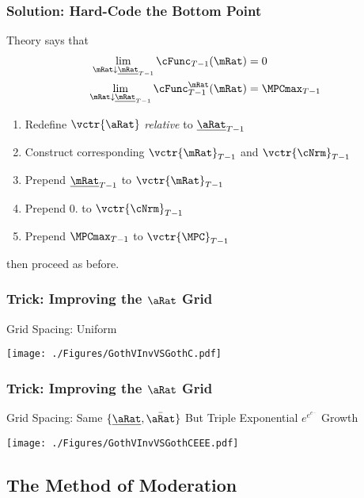 \documentclass{beamer}
\begin{document}
\begin{frame}
\frametitle{Solution: Hard-Code the Bottom Point}

Theory says that
\begin{equation}\begin{gathered}\begin{aligned}
  \lim_{\mRat \downarrow \underline{\mRat}_{T-1}} \cFunc_{T-1}(\mRat)  & = 0
\\ \lim_{\mRat \downarrow \underline{\mRat}_{T-1}} \cFunc_{T-1}^{\mRat}(\mRat)  & = \MPCmax_{T-1}
\end{aligned}\end{gathered}\end{equation}

\medskip 

\begin{enumerate}
\item Redefine $\vctr{\aRat}$ {\it relative} to $\uline{\aRat}_{T-1}$
\item Construct corresponding $\vctr{\mRat}_{T-1}$ and $\vctr{\cNrm}_{T-1}$
\item Prepend $\uline{\mRat}_{T-1}$ to $\vctr{\mRat}_{T-1}$
\item Prepend $0.$ to $\vctr{\cNrm}_{T-1}$
\item Prepend $\MPCmax_{T-1}$ to $\vctr{\MPC}_{T-1}$
\end{enumerate}
then proceed as before.

\end{frame}

\begin{frame}
\frametitle{Trick: Improving the $\aRat$ Grid}
Grid Spacing: Uniform

\texttt{[image: ./Figures/GothVInvVSGothC.pdf]}

\end{frame}


\begin{frame}
\frametitle{Trick: Improving the $\aRat$ Grid}
Grid Spacing: Same $\{\uline{\aRat},\bar{\aRat}\}$ But Triple Exponential $e^{e^{e^{...}}}$ Growth

\texttt{[image: ./Figures/GothVInvVSGothCEEE.pdf]}

\end{frame}


\subsection{The Method of Moderation}
\end{document}
